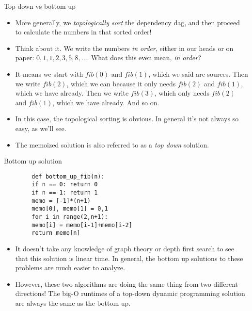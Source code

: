 \documentclass{beamer}
\begin{document}
\begin{frame}[fragile]{Top down vs bottom up}
    \begin{itemize}
        \item More generally, we \emph{topologically sort} the dependency dag, and then proceed to calculate the numbers in that sorted order! \pause 
        \item Think about it. We write the numbers \emph{in order}, either in our heads or on paper: $0,1,1,2,3,5,8,\ldots$. What does this even mean, \emph{in order}?
        \item It means we start with $fib(0)$ and $fib(1)$, which we said are sources. Then we write $fib(2)$, which we can because it only needs $fib(2)$ and $fib(1)$, which we have already. Then we write $fib(3)$, which only needs $fib(2)$ and $fib(1)$, which we have already. And so on. \pause 
        \item In this case, the topological sorting is obvious. In general it's not always so easy, as we'll see. \pause 
        \item The memoized solution is also referred to as a \emph{top down} solution.  
    \end{itemize}
\end{frame}

\begin{frame}[fragile]{Bottom up solution}
    \begin{verbatim}
        def bottom_up_fib(n):
	    if n == 0: return 0
	    if n == 1: return 1
	    memo = [-1]*(n+1)
	    memo[0], memo[1] = 0,1
	    for i in range(2,n+1):
		memo[i] = memo[i-1]+memo[i-2]
    	return memo[n]
    \end{verbatim}
    \begin{itemize}
        \item It doesn't take any knowledge of graph theory or depth first search to see that this solution is linear time. In general, the bottom up solutions to these problems are much easier to analyze. 
        \item However, these two algorithms are doing the same thing from two different directions! The big-O runtimes of a top-down dynamic programming solution are always the same as the bottom up. \pause 
    \end{itemize}
\end{frame}
\end{document}
